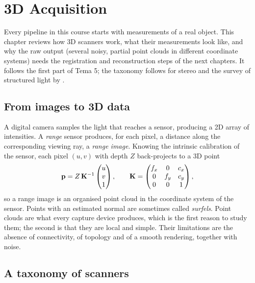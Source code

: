 \chapter{3D Acquisition}\label{ch:acq}

Every pipeline in this course starts with measurements of a real object. This chapter reviews how
3D scanners work, what their measurements look like, and why the raw output (several noisy,
partial point clouds in different coordinate systems) needs the registration and reconstruction
steps of the next chapters. It follows the first part of Tema 5; the taxonomy follows
\citet{Hartley2004} for stereo and the survey of structured light by \citet{Geng2011}.

\section{From images to 3D data}

A digital camera samples the light that reaches a sensor, producing a 2D array of intensities. A
\emph{range} sensor produces, for each pixel, a distance along the corresponding viewing ray, a
\emph{range image}. Knowing the intrinsic calibration of the sensor, each pixel $(u,v)$ with depth
$Z$ back-projects to a 3D point
\begin{equation}
\mathbf{p}=Z\,\mathbf{K}^{-1}\begin{pmatrix}u\\v\\1\end{pmatrix},\qquad
\mathbf{K}=\begin{pmatrix}f_x&0&c_x\\0&f_y&c_y\\0&0&1\end{pmatrix},
\end{equation}
so a range image is an organised point cloud in the coordinate system of the sensor. Points with
an estimated normal are sometimes called \emph{surfels}. Point clouds are what every capture device
produces, which is the first reason to study them; the second is that they are local and simple.
Their limitations are the absence of connectivity, of topology and of a smooth rendering, together
with noise.

\section{A taxonomy of scanners}

